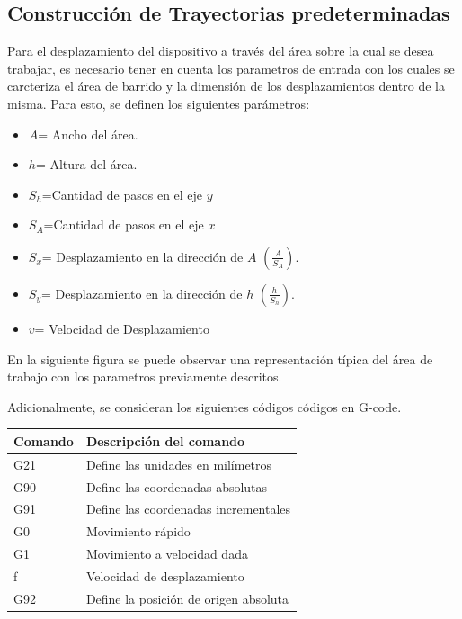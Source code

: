 \documentclass{article}
\begin{document}
\begin{multicols}{2}
{\centering \section{Construcción de Trayectorias predeterminadas}}
Para el desplazamiento del dispositivo a través del área sobre la cual se desea trabajar, es necesario tener en cuenta los parametros de entrada con los cuales se carcteriza el área de barrido y la dimensión de los desplazamientos dentro de la misma. Para esto, se definen los siguientes parámetros:\\

\begin{itemize}
\item $A$= Ancho del área.
\item $h$= Altura del área.
\item $S_h$=Cantidad de pasos en el eje $y$
\item $S_A$=Cantidad de pasos en el eje $x$
\item $S_{x}$= Desplazamiento en la dirección de $A$ $(\frac{A}{S_A})$.
\item $S_{y}$= Desplazamiento en la dirección de $h$ $(\frac{h}{S_h})$.
\item $v$= Velocidad de Desplazamiento 
\end{itemize}

En la siguiente figura se puede observar una representación típica del área de trabajo con los parametros previamente descritos.



Adicionalmente, se consideran los siguientes códigos códigos en G-code.
\begin{table}[H]
\centering
\label{my-label}
\begin{tabular}{|l|l|}
\hline
Comando & Descripción del comando                               \\ \hline
G21     & Define las unidades en milímetros                     \\ \hline
G90     & Define las coordenadas absolutas      \\ \hline
G91     & Define las coordenadas incrementales \\ \hline
G0      & Movimiento rápido                                     \\ \hline
G1      & Movimiento a velocidad dada                                      \\ \hline
f       & Velocidad de desplazamiento                           \\ \hline
G92     & Define la posición de origen absoluta                 \\ \hline
\end{tabular}
\end{table}


\end{multicols}
\end{document}
